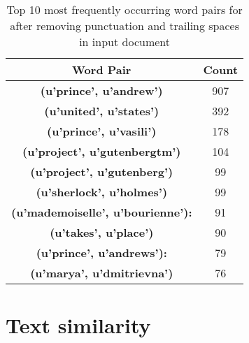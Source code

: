 \documentclass[11pt]{article}
\begin{document}
\begin{itemize}
	\begin{table}[h]
		\centering
		\begin{tabular}{|c|c|}
			\hline
			\textbf{Word Pair}  & \textbf{Count}   \\
			\hline
			\textbf{(u'prince', u'andrew')} &  907    \\
			\hline
			\textbf{(u'united', u'states')} &  392    \\
			\hline
			\textbf{(u'prince', u'vasili')}  &  178   \\
			\hline
			\textbf{(u'project', u'gutenbergtm')}  &  104   \\
			\hline
			\textbf{(u'project', u'gutenberg')}  &  99  \\
			\hline
			\textbf{(u'sherlock', u'holmes')}  &  99  \\
			\hline
			\textbf{(u'mademoiselle', u'bourienne'):}  &  91  \\
			\hline
			\textbf{(u'takes', u'place')}  &  90  \\
			\hline
			\textbf{(u'prince', u'andrews'):}  &  79   \\
			\hline
			\textbf{(u'marya', u'dmitrievna')}  &  76  \\
			\hline
		\end{tabular}
		\caption{Top 10 most frequently occurring word pairs for after removing punctuation and trailing spaces in input document}
		\label{t2}
	\end{table}


\end{itemize}


\section{Text similarity}
\end{document}
